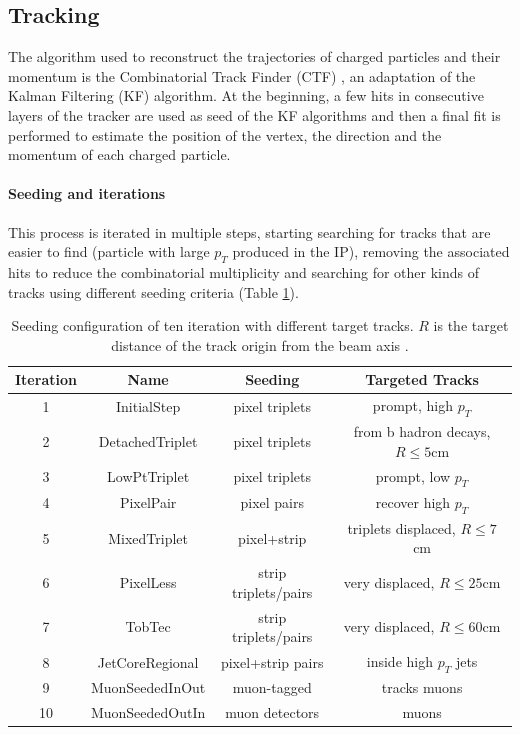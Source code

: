 \subsection{Tracking}\label{sec:tracking}
The algorithm used to reconstruct the trajectories of charged particles and their momentum is the Combinatorial Track Finder (CTF) \cite{Chatrchyan2014DescriptionTracker}, an adaptation of the Kalman Filtering (KF) \cite{Fruhwirth1987ApplicationFitting} algorithm.
At the beginning, a few hits in consecutive layers of the tracker are used as seed of the KF algorithms and then a final fit is performed to estimate the position of the vertex, the direction and the momentum of each charged particle.\\

\paragraph*{Seeding and iterations}
This process is iterated in multiple steps, starting searching for tracks that are easier to find (\eg particle with large $p_T$ produced in the IP), removing the associated hits to reduce the combinatorial multiplicity and searching for other kinds of tracks using different seeding criteria (Table \ref{tab:track_seeding}).

\begin{table}[h!]
    \centering
    \begin{tabular}{|c|c|c|c|}
    \hline
    Iteration&Name&Seeding&Targeted Tracks\\
    \hline
    1& InitialStep&pixel triplets&prompt, high $p_T$\\
    2& DetachedTriplet&pixel triplets&from b hadron decays, $R\leq 5$cm\\
    3& LowPtTriplet&pixel triplets&prompt, low $p_T$\\
    4& PixelPair&pixel pairs&recover high $p_T$\\
    5& MixedTriplet&pixel+strip&triplets displaced, $R\leq 7$cm\\
    6& PixelLess&strip triplets/pairs&very displaced, $R\leq 25$cm\\
    7& TobTec&strip triplets/pairs&very displaced, $R\leq 60$cm\\
    8& JetCoreRegional&pixel+strip pairs&inside high $p_T$ jets\\
    9& MuonSeededInOut&muon-tagged&tracks muons\\
    10& MuonSeededOutIn&muon detectors&muons \\
    \hline
    \end{tabular}
    \caption{Seeding configuration of ten iteration with different target tracks. $R$ is the target distance of the track origin from the beam axis \cite{Sirunyan2017Particle-flowDetector}. }
    \label{tab:track_seeding}
\end{table}

